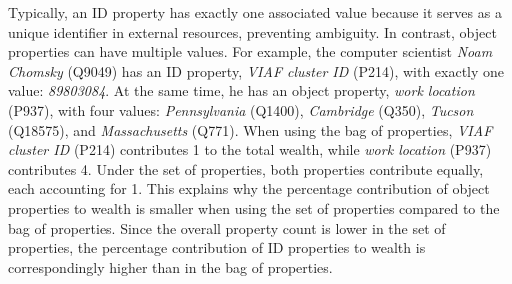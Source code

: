 Typically, an ID property has exactly one associated value because it serves as a unique identifier in external resources, preventing ambiguity. In contrast, object properties can have multiple values. For example, the computer scientist \textit{Noam Chomsky} (Q9049) has an ID property, \textit{VIAF cluster ID} (P214), with exactly one value: \textit{89803084}. At the same time, he has an object property, \textit{work location} (P937), with four values: \textit{Pennsylvania} (Q1400), \textit{Cambridge} (Q350), \textit{Tucson} (Q18575), and \textit{Massachusetts} (Q771). When using the bag of properties, \textit{VIAF cluster ID} (P214) contributes 1 to the total wealth, while \textit{work location} (P937) contributes 4. Under the set of properties, both properties contribute equally, each accounting for 1. This explains why the percentage contribution of object properties to wealth is smaller when using the set of properties compared to the bag of properties. Since the overall property count is lower in the set of properties, the percentage contribution of ID properties to wealth is correspondingly higher than in the bag of properties.